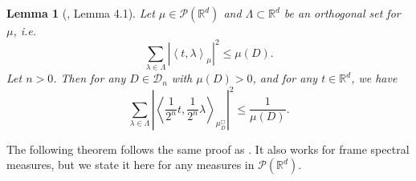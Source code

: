 \documentclass[12pt,a4paper,intlimits,sumlimits]{amsart}
\theoremstyle{plain}
\newtheorem{lemma}{Lemma}
\theoremstyle{definition}
\newcommand{\RR}{{\mathbb R}}
\newcounter{rem}
\begin{document}
\begin{lemma}[\cite{Shi21}, Lemma 4.1]\label{lem:change measure}
Let  $\mu\in \mathcal{P} (\RR^d) $ and $\Lambda\subset\RR^d$ be an orthogonal set for $\mu$, i.e.
    \begin{equation}\label{eq:change measure 1}
	  \sum_{\lambda\in \Lambda} \left|\left\langle t, \lambda \right\rangle_{\mu}  \right|^2\le  \mu(D).
	\end{equation}
    Let $n>0$. Then for any $D\in \mathcal{D}_n$ with $\mu(D)>0$, and for any $t\in \RR^d$, we have
	\begin{equation*}
    \sum_{\lambda\in \Lambda} \left|\left\langle \frac{1}{2^n}t, \frac{1}{2^n}\lambda \right\rangle_{\mu_{D}^{\Box}}  \right|^2\le \frac{1}{\mu(D)}.
	\end{equation*}
\end{lemma} 

 

The following theorem follows the same proof as \cite[Theorem 1.2]{Shi21}. It also works for frame spectral measures, but we state it here for any measures in $\mathcal{P}(\mathbb{R}^d)$.
 
\end{document}
